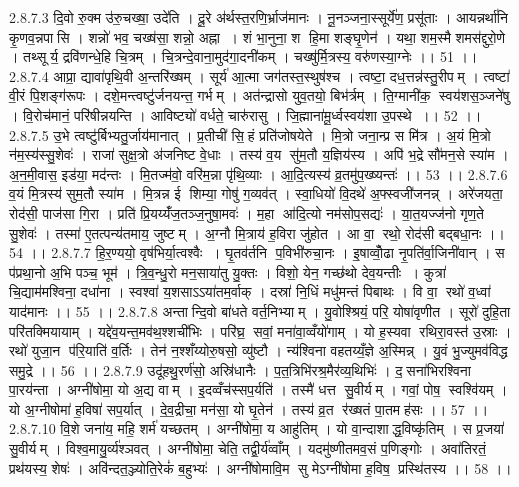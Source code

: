 2.8.7.3
दि॒वो रु॒क्म उ॑रु॒चख्षा॒ उदे॑ति । दू॒रे अ॑र्थस्त॒रणि॒र्भ्राज॑मानः । नू॒नञ्जना॒स्सूर्ये॑ण॒ प्रसू॑ताः । आयन्नर्था॑नि कृ॒णव॒न्नपा॑सि । शन्नो॑ भव॒ चख्ष॑सा॒ शन्नो॒ अह्ना । शं भा॒नुना॒ श हि॒मा शङ्घृ॒णेन॑ । यथा॒ शम॒स्मै शमस॑द्दुरो॒णे । तथ्सूर्य॒ द्रवि॑णन्धे॒हि चि॒त्रम् । चि॒त्रन्दे॒वाना॒मुद॑गा॒दनी॑कम् । चख्षु॑र्मि॒त्रस्य॒ वरु॑णस्या॒ग्नेः ।। 51 ।।
2.8.7.4
आप्रा॒ द्यावा॑पृथि॒वी अ॒न्तरि॑ख्षम् । सूर्य॑ आ॒त्मा जग॑तस्त॒स्थुष॑श्च । त्वष्टा॒ दध॒त्तन्न॑स्तु॒रीपम् । त्वष्टा॑ वी॒रं पि॒शङ्ग॑रूपः । दशे॒मन्त्वष्टु॑र्जनयन्त॒ गर्भम् । अत॑न्द्रासो युव॒तयो॒ बिभ॑र्त्रम् । ति॒ग्मानी॑क॒॒ स्वय॑शस॒ञ्जने॑षु । वि॒रोच॑मानं॒ परि॑षीन्नयन्ति । आविष्ट्यो॑ वर्धते॒ चारु॑रासु । जि॒ह्माना॑मू॒र्ध्वस्वय॑शा उ॒पस्थे ।। 52 ।।
2.8.7.5
उ॒भे त्वष्टु॑र्बिभ्यतु॒र्जाय॑मानात् । प्र॒तीची॑ सि॒॒हं प्रति॑जोषयेते । मि॒त्रो जना॒न्प्र स मि॑त्र । अ॒यं मि॒त्रो न॑म॒स्य॑स्सु॒शेवः॑ । राजा॑ सुक्ष॒त्रो अ॑जनिष्ट वे॒धाः । तस्य॑ व॒य सु॑म॒तौ य॒ज्ञिय॑स्य । अपि॑ भ॒द्रे सौ॑मन॒से स्या॑म । अ॒न॒मी॒वास॒ इड॑या॒ मद॑न्तः । मि॒तज्म॑वो॒ वरि॑म॒न्ना पृ॑थि॒व्याः । आ॒दि॒त्यस्य॑ व्र॒तमु॑प॒ख्ष्यन्तः॑ ।। 53 ।।
2.8.7.6
व॒यं मि॒त्रस्य॑ सुम॒तौ स्या॑म । मि॒त्रन्न ई शिम्या॒ गोषु॑ ग॒व्यव॑त् । स्वा॒धियो॑ वि॒दथे॑ अ॒फ्स्वजी॑जनन्न् । अरे॑जयता॒॒ रोद॑सी॒ पाज॑सा गि॒रा । प्रति॑ प्रि॒यय्यँ॑ज॒तञ्ज॒नुषा॒मवः॑ । म॒हा आ॑दि॒त्यो नम॑सोप॒सद्यः॑ । या॒त॒यज्ज॑नो गृण॒ते सु॒शेवः॑ । तस्मा॑ ए॒तत्पन्य॑तमाय॒ जुष्टम् । अ॒ग्नौ मि॒त्राय॑ ह॒विरा जु॑होत । आ वा॒॒ रथो॒ रोद॑सी बद्बधा॒नः ।। 54 ।।
2.8.7.7
हि॒र॒ण्ययो॒ वृष॑भिर्या॒त्वश्वैः । घृ॒तव॑र्तनि प॒विभी॑रुचा॒नः । इ॒षाव्वोँ॒ढा नृ॒पति॑र्वा॒जिनी॑वान् । स प॑प्रथा॒नो अ॒भि पञ्च॒ भूम॑ । त्रि॒व॒न्धु॒रो मन॒साया॑तु यु॒क्तः । विशो॒ येन॒ गच्छ॑थो देव॒यन्तीः । कुत्रा॑ चि॒द्याम॑मश्विना॒ दधा॑ना । स्वश्वा॑ य॒शसाऽऽया॑तम॒र्वाक् । दस्रा॑ नि॒धिं मधु॑मन्तं पिबाथः । वि वा॒॒ रथो॑ व॒ध्वा॑ याद॑मानः ।। 55 ।।
2.8.7.8
अन्तान्दि॒वो बा॑धते वर्त॒निभ्याम् । यु॒वोश्श्रियं॒ परि॒ योषा॑वृणीत । सूरो॑ दुहि॒ता परि॑तक्मियायाम् । यद्दे॑व॒यन्त॒मव॑थ॒श्शची॑भिः । परि॑घ्र॒॒ सवां॒ मना॑वा॒व्वँयो॑गाम् । यो ह॒स्यवा॑ रथिरा॒वस्त॑ उ॒स्राः । रथो॑ युजा॒न प॑रि॒याति॑ व॒र्तिः । तेन॑ न॒श्शँय्योरु॒षसो॒ व्यु॑ष्टौ । न्य॑श्विना वहतय्यँ॒ज्ञे अ॒स्मिन्न् । यु॒वं भु॒ज्युमव॑विद्ध समु॒द्रे ।। 56 ।।
2.8.7.9
उदू॑हथु॒रर्ण॑सो॒ अस्रि॑धानैः । प॒त॒त्रिभि॑रश्र॒मैर॑व्य॒थिभिः॑ । द॒॒सना॑भिरश्विना पा॒रय॑न्ता । अग्नी॑षोमा॒ यो अ॒द्य वाम् । इ॒दव्वँच॑स्सप॒र्यति॑ । तस्मै॑ धत्त सु॒वीर्यम् । गवां॒ पोष॒॒ स्वश्वि॑यम् । यो अ॒ग्नीषोमा॑ ह॒विषा॑ सप॒र्यात् । दे॒व॒द्रीचा॒ मन॑सा॒ यो घृ॒तेन॑ । तस्य॑ व्र॒त र॑ख्षतं पा॒तमह॑सः ।। 57 ।।
2.8.7.10
वि॒शे जना॑य॒ महि॒ शर्म॑ यच्छतम् । अग्नी॑षोमा॒ य आहु॑तिम् । यो वा॒न्दाशाद्ध॒विष्कृ॑तिम् । स प्र॒जया॑ सु॒वीर्यम् । विश्व॒मायु॒र्व्य॑श्ञवत् । अग्नी॑षोमा॒ चेति॒ तद्वी॒र्य॑व्वाँम् । यदमु॑ष्णीतमव॒सं प॒णिङ्गोः । अवा॑तिरतं॒ प्रथ॑यस्य॒ शेषः॑ । अवि॑न्दत॒ञ्ज्योति॒रेकं॑ ब॒हुभ्यः॑ । अग्नी॑षोमावि॒म सु मेऽग्नी॑षोमा ह॒विष॒ प्रस्थि॑तस्य ।। 58 ।।
